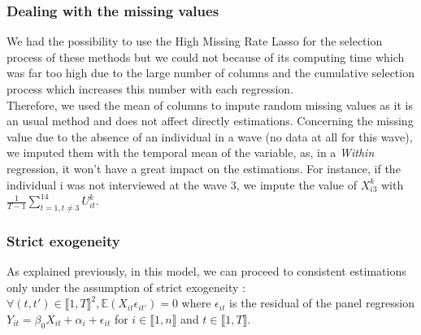 \documentclass[]{article}
\begin{document}
\subsubsection{Dealing with the missing values}
We had the possibility to use the High Missing Rate Lasso for the selection process of these methods but we could not because of its computing time which was far too high due to the large number of columns and the cumulative selection process which increases this number with each regression.\\
Therefore, we used the mean of columns to impute random missing values as it is an usual method and does not affect directly estimations. Concerning the missing value due to the absence of an individual in a wave (no data at all for this wave), we imputed them with the temporal mean of the variable, as, in a \textit{Within} regression, it won't have a great impact on the estimations. For instance, if the individual i was not interviewed at the wave 3, we impute the value of ${X}_{i3}^k$ with $\frac{1}{T-1} \sum_{t=1, t \ne 3}^{14} U_{it}^k$. 

\subsubsection{Strict exogeneity}
As explained previously, in this model, we can proceed to consistent estimations only under the assumption of strict exogeneity : $\forall (t,t')\in \llbracket1,T\rrbracket^2, \mathbb{E}(X_{it}\epsilon_{it'}) = 0$ where $\epsilon_{it}$ is the residual of the panel regression ${Y}_{it} = \beta_0 {X}_{it} + \alpha_i + \epsilon_{it}$ for  $i \in \llbracket1,n\rrbracket$ and $ t \in \llbracket1,T\rrbracket$. \\
\end{document}
